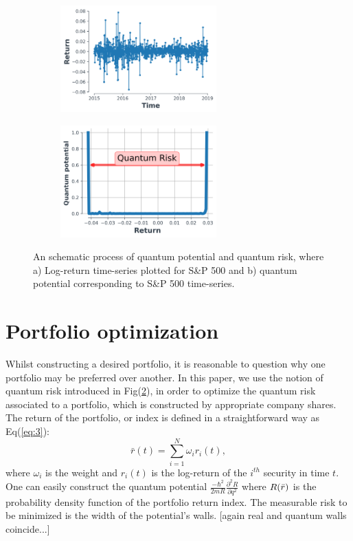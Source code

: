 \documentclass[ aip,jmp,reprint]{revtex4-2}
\begin{document}
\begin{figure}[htb]
\centering
\begin{subfigure}{0.5\textwidth}
		\centering
		\includegraphics[width=60mm]{fig0a.png}
		\caption{}
		\label{fig:sub1}
	\end{subfigure} 
\begin{subfigure}{0.5\textwidth}
		\centering
		\includegraphics[width=60mm]{fig0_b.png}
		\caption{ }
		\label{fig:sub2}
	\end{subfigure}
\caption{An schematic process of quantum potential and quantum risk, where
a) Log-return time-series plotted for S\&P 500 and b) quantum potential
corresponding to S\&P 500 time-series.}
\label{fig:1}
\end{figure}
\newpage

\section{Portfolio optimization}

Whilst constructing a desired portfolio, it is reasonable to question why
one portfolio may be preferred over another. In this paper, we use the
notion of quantum risk introduced in Fig(\ref{fig:sub2}), in order to
optimize the quantum risk associated to a portfolio, which is constructed by
appropriate company shares. The return of the portfolio, or index is defined
in a straightforward way as Eq(\ref{eq:3}): \newline
\begin{equation}
\bar{r}(t)=\sum_{i=1}^{N}\omega _{i}r_{i}(t),  \label{eq:3}
\end{equation}%
\newline
where $\omega _{i}$ is the weight and $r_{i}(t)$ is the log-return of the $%
i^{th}$ security in time $t$. One can easily construct the quantum potential 
$\frac{-\hbar ^{2}}{2mR}\frac{\partial ^{2}R}{\partial q^{2}}$ where $R(\bar{%
r})$ is the probability density function  of the portfolio return index. The
measurable risk to be minimized is the width of the potential's walls.
[again real and quantum walls coincide...]
\end{document}

